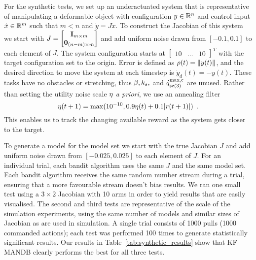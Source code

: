 For the synthetic tests, we set up an underactuated system that is representative of manipulating a deformable object with configuration $y \in \mathbb{R}^n$ and control input $\dot x \in \mathbb{R}^m$ such that $m < n$ and $\dot y = J \dot x$. To construct the Jacobian of this system we start with $J = \begin{bmatrix}\mathbf{I}_{m \times m} \\ \mathbf{0}_{(n-m) \times m} \end{bmatrix}$ and add uniform noise drawn from $[-0.1, 0.1]$ to each element of $J$. The system configuration starts at $\begin{bmatrix}10 & \dots & 10\end{bmatrix}^T$ with the target configuration set to the origin. Error is defined as $\rho(t) = \| y(t) \|$, and the desired direction to move the system at each timestep is $\dot y_d(t) = - y(t)$. These tasks have no obstacles or stretching, thus $\beta, k_s,$ and $\dot{q}^\textrm{max,c}_{\mathfrak{se}(3)}$ are unused. Rather than setting the utility noise scale $\eta$ \textit{a priori}, we use an annealing filter
\begin{equation}
    \eta(t+1) = \max(10^{-10}, 0.9 \eta(t) + 0.1 |r(t+1)|) \enspace.
\end{equation}
This enables us to track the changing available reward as the system gets closer to the target.

To generate a model for the model set we start with the true Jacobian $J$ and add uniform noise drawn from $[-0.025, 0.025]$ to each element of $J$. For an individual trial, each bandit algorithm uses the same $J$ and the same model set. Each bandit algorithm receives the same random number stream during a trial, ensuring that a more favourable stream doesn't bias results. We ran one small test using a $3 \times 2$ Jacobian with 10 arms in order to yield results that are easily visualised. The second and third tests are representative of the scale of the simulation experiments, using the same number of models and similar sizes of Jacobian as are used in simulation. A single trial consists of 1000 pulls (1000 commanded actions); each test was performed 100 times to generate statistically significant results. Our results in Table~\ref{tab:synthetic_results} show that KF-MANDB clearly performs the best for all three tests.


